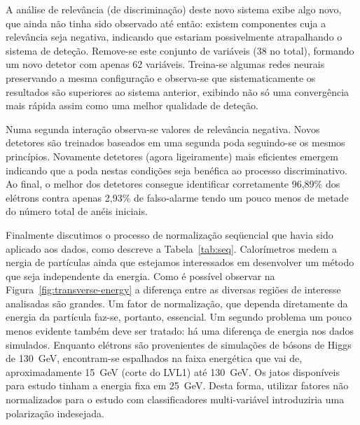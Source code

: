 A análise de relevância (de discriminação) deste novo sistema exibe algo novo,
que ainda não tinha sido observado até então: existem componentes cuja a
relevância seja negativa, indicando que estariam possivelmente atrapalhando o
sistema de deteção. Remove-se este conjunto de variáveis (38 no total),
formando um novo detetor com apenas 62 variáveis. Treina-se algumas redes
neurais preservando a mesma configuração e observa-se que sistematicamente os
resultados são superiores ao sistema anterior, exibindo não só uma
convergência mais rápida assim como uma melhor qualidade de deteção.

Numa segunda interação observa-se valores de relevância negativa. Novos
detetores são treinados baseados em uma segunda poda seguindo-se os mesmos
princípios. Novamente detetores (agora ligeiramente) mais eficientes emergem
indicando que a poda nestas condições seja benéfica ao processo
discriminativo. Ao final, o melhor dos detetores consegue identificar
corretamente 96,89\% dos elétrons contra apenas 2,93\% de falso-alarme tendo
um pouco menos de metade do número total de anéis iniciais.

Finalmente discutimos o processo de normalização seqüencial que havia sido
aplicado aos dados, como descreve a Tabela~\ref{tab:seq}. Calorímetros medem a
nergia de partículas ainda que estejamos interessados em desenvolver um método
que seja independente da energia. Como é possível observar na
Figura~\ref{fig:transverse-energy} a diferença entre as diversas regiões de
interesse analisadas são grandes. Um fator de normalização, que dependa
diretamente da energia da partícula faz-se, portanto, essencial. Um segundo
problema um pouco menos evidente também deve ser tratado: há uma diferença de
energia nos dados simulados. Enquanto elétrons são provenientes de simulações
de bósons de Higgs de 130~GeV, encontram-se espalhados na faixa energética que
vai de, aproximadamente 15~GeV (corte do LVL1) até 130~GeV. Os jatos
disponíveis para estudo tinham a energia fixa em 25~GeV. Desta forma, utilizar
fatores não normalizados para o estudo com classificadores multi-variável
introduziria uma polarização indesejada.

